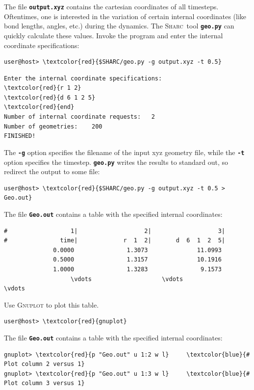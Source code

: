 \documentclass[a4paper,11pt,DIV=15,openany]{scrbook}
\newcommand{\sharc}{\textsc{Sharc}}
\newcommand{\ttt}[1]{\textbf{\texttt{#1}}}
\begin{document}
The file \ttt{output.xyz} contains the cartesian coordinates of all timesteps. Oftentimes, one is interested in the variation of certain internal coordinates (like bond lengths, angles, etc.) during the dynamics. The \sharc\ tool \ttt{geo.py} can quickly calculate these values. Invoke the program and enter the internal coordinate specifications:
\begin{Verbatim}[commandchars=\\\{\}]
user@host> \textcolor{red}{$SHARC/geo.py -g output.xyz -t 0.5}
\end{Verbatim}

\begin{oframed}
\footnotesize\begin{Verbatim}[commandchars=\\\{\}]
Enter the internal coordinate specifications:
\textcolor{red}{r 1 2}
\textcolor{red}{d 6 1 2 5}
\textcolor{red}{end}
Number of internal coordinate requests:   2
Number of geometries:    200
FINISHED!
\end{Verbatim}
\end{oframed}

\normalsize
The \ttt{-g} option specifies the filename of the input xyz geometry file, while the \ttt{-t} option specifies the timestep. \ttt{geo.py} writes the results to standard out, so redirect the output to some file:
\begin{Verbatim}[commandchars=\\\{\}]
user@host> \textcolor{red}{$SHARC/geo.py -g output.xyz -t 0.5 > Geo.out}
\end{Verbatim}
The file \ttt{Geo.out} contains a table with the specified internal coordinates:
\begin{oframed}
\footnotesize\begin{Verbatim}[commandchars=\\\{\}]
#                  1|                   2|                   3|
#               time|             r  1  2|       d  6  1  2  5|
              0.0000               1.3073              11.0993 
              0.5000               1.3157              10.1916 
              1.0000               1.3283               9.1573 
                   \vdots                    \vdots                    \vdots
\end{Verbatim}
\end{oframed}

Use \textsc{Gnuplot} to plot this table. 
\begin{Verbatim}[commandchars=\\\{\}]
user@host> \textcolor{red}{gnuplot}
\end{Verbatim}
The file \ttt{Geo.out} contains a table with the specified internal coordinates:
\begin{oframed}
\footnotesize\begin{Verbatim}[commandchars=\\\{\}]
gnuplot> \textcolor{red}{p "Geo.out" u 1:2 w l}     \textcolor{blue}{# Plot column 2 versus 1}
gnuplot> \textcolor{red}{p "Geo.out" u 1:3 w l}     \textcolor{blue}{# Plot column 3 versus 1}
\end{Verbatim}
\end{oframed}
\end{document}
